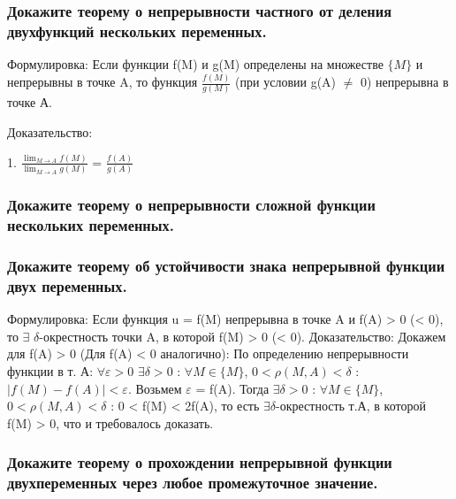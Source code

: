 \documentclass[a4paper, 12pt]{article}
\renewcommand{\epsilon}{\varepsilon}
\def\newline{}%
\begin{document}
            \subsubsection{Докажите теорему о непрерывности частного от деления двух\newline функций нескольких переменных. }

            Формулировка:
            Если функции f(M) и g(M) определены на множестве $\{M\}$ и\newline
            непрерывны в точке A, то функция $\frac{f(M)}{g(M)}$
            (при условии g(A) $\neq$ 0) непрерывна в точке А.

            Доказательство:

            1. $\frac{\displaystyle{\lim_{M \rightarrow A}}f(M)}{\displaystyle{\lim_{M\rightarrow A}}g(M)}$ = $\frac{f(A)}{g(A)}$


            \subsubsection{Докажите теорему о непрерывности сложной функции нескольких переменных.}



            \subsubsection{Докажите теорему об устойчивости знака непрерывной функции двух переменных.}

            Формулировка:
            Если функция u = f(M) непрерывна в точке A и f(A) > 0 (< 0), то
            $\exists$ $\delta$-окрестность точки A, в которой f(M) > 0 (< 0).\newline
            Доказательство:\newline
            Докажем для f(A) > 0 (Для f(A) < 0 аналогично):\newline
            По определению непрерывности функции в т. А: 
            $\forall \epsilon > 0$ $\exists \delta > 0$ : $\forall M \in \{M\}$,
            $0 < \rho(M, A) < \delta$ : $|f(M) - f(A)| < \epsilon$.\newline
            Возьмем $\epsilon$ = f(A). Тогда $\exists \delta > 0$ : 
            $\forall M \in \{M\}$, $0 < \rho(M, A) < \delta$ : 0 < f(M) < 2f(A),
            то есть $\exists \delta$-окрестность т.А, в которой f(M) > 0,
            что и требовалось доказать.

            \subsubsection{Докажите теорему о прохождении непрерывной функции двух\newline переменных через любое промежуточное значение. }
\end{document}
